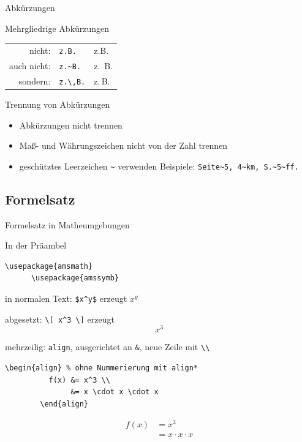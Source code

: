 \begin{Frame}[fragile]{Abkürzungen}
  \begin{Block}{Mehrgliedrige Abkürzungen}
    \begin{tabular}{rll}
      nicht: & \lstinline-z.B.- & z.B. \\
      auch nicht: & \lstinline-z.~B.- & z.~B. \\
      sondern: & \lstinline-z.\,B.- & z.\,B. \\
    \end{tabular}
  \end{Block}
  
  \begin{Block}{Trennung von Abkürzungen}
    \begin{itemize}
      \item Abkürzungen nicht trennen
      \item Maß- und Währungszeichen nicht von der Zahl trennen
      \item geschütztes Leerzeichen \lstinline-~- verwenden\newline
        Beispiele: \lstinline-Seite~5, 4~km, S.~5~ff.-
    \end{itemize}
  \end{Block}
\end{Frame}

\subsection{Formelsatz}

\begin{Frame}[fragile]{Formelsatz in Matheumgebungen}
  \begin{Block}{In der Präambel}
    \begin{lstlisting}[gobble=6,style=block]
      \usepackage{amsmath}
      \usepackage{amssymb}
    \end{lstlisting}
  \end{Block}
  
  \begin{looseitemize}
    \item in normalen Text: \lstinline-$x^y$- erzeugt $x^y$
    \item abgesetzt: \lstinline-\[ x^3 \]- erzeugt
      \[ x^3 \]
    \item mehrzeilig: \lstinline-align-, ausgerichtet an \lstinline-&-, neue Zeile mit \lstinline-\\- 
      \begin{lstlisting}[gobble=8]
        \begin{align} % ohne Nummerierung mit align*
          f(x) &= x^3 \\
               &= x \cdot x \cdot x
        \end{align}
      \end{lstlisting}
      \begin{align}
        f(x) &= x^3 \\
             &= x \cdot x \cdot x
      \end{align}
  \end{looseitemize}
\end{Frame}

